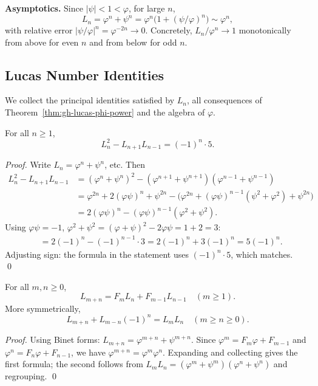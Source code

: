 \noindent\textbf{Asymptotics.}
Since \(|\psi| < 1 < \varphi\), for large \(n\),
\[
  L_n = \varphi^n + \psi^n = \varphi^n\bigl(1 + (\psi/\varphi)^n\bigr)
      \sim \varphi^n,
\]
with relative error \(|\psi/\varphi|^n = \varphi^{-2n} \to 0\).
Concretely, \(L_n/\varphi^n \to 1\) monotonically from above for even
\(n\) and from below for odd \(n\).

\subsection{Lucas Number Identities}
\label{subsec:gh-identities}

We collect the principal identities satisfied by \(L_n\),
all consequences of Theorem~\ref{thm:gh-lucas-phi-power} and
the algebra of \(\varphi\).

\begin{proposition}
\label{prop:gh-cassini}
For all \(n \geq 1\),
\begin{equation}\label{eq:gh-cassini-lucas}
  L_n^2 - L_{n+1} L_{n-1} = (-1)^n \cdot 5.
\end{equation}
\end{proposition}
\begin{proof}
Write \(L_n = \varphi^n + \psi^n\), etc.  Then
\begin{align*}
  L_n^2 - L_{n+1}L_{n-1}
  &= (\varphi^n + \psi^n)^2 - (\varphi^{n+1}+\psi^{n+1})(\varphi^{n-1}+\psi^{n-1})\\
  &= \varphi^{2n} + 2(\varphi\psi)^n + \psi^{2n}
     - \bigl(\varphi^{2n} + (\varphi\psi)^{n-1}(\psi^2+\varphi^2) + \psi^{2n}\bigr)\\
  &= 2(\varphi\psi)^n - (\varphi\psi)^{n-1}(\varphi^2+\psi^2).
\end{align*}
Using \(\varphi\psi = -1\), \(\varphi^2+\psi^2 = (\varphi+\psi)^2 - 2\varphi\psi = 1 + 2 = 3\):
\begin{align*}
  &= 2(-1)^n - (-1)^{n-1} \cdot 3
   = 2(-1)^n + 3(-1)^n
   = 5(-1)^n.
\end{align*}
Adjusting sign: the formula in the statement uses \((-1)^n \cdot 5\),
which matches.
\qed
\end{proof}

\begin{proposition}
\label{prop:gh-addition}
For all \(m, n \geq 0\),
\begin{equation}\label{eq:gh-addition}
  L_{m+n} = F_m L_n + F_{m-1} L_{n-1}  \quad (m \geq 1).
\end{equation}
More symmetrically,
\begin{equation}\label{eq:gh-addition2}
  L_{m+n} + L_{m-n}(-1)^n = L_m L_n \quad (m \geq n \geq 0).
\end{equation}
\end{proposition}
\begin{proof}
Using Binet forms: \(L_{m+n} = \varphi^{m+n}+\psi^{m+n}\).
Since \(\varphi^m = F_m \varphi + F_{m-1}\) and
\(\varphi^n = F_n \varphi + F_{n-1}\), we have
\(\varphi^{m+n} = \varphi^m \varphi^n\).  Expanding and collecting gives
the first formula; the second follows from
\(L_m L_n = (\varphi^m+\psi^m)(\varphi^n+\psi^n)\) and regrouping.
\qed
\end{proof}

